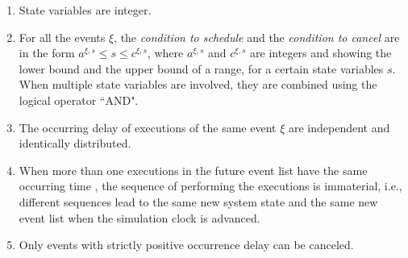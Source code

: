 \documentclass[]{interact}
\theoremstyle{plain}%
\theoremstyle{definition}
\theoremstyle{remark}
\begin{document}
\begin{enumerate}
	\item State variables are integer.
	\item For all the events $\xi$, the \textit{condition to schedule} and the \textit{condition to cancel} are in the form $a^{\xi,s}\le s \le c^{\xi,s}$, where $a^{\xi,s}$ and $c^{\xi,s}$ are integers and showing the lower bound and the upper bound of a range, for a certain state variables $s$. When multiple state variables are involved, they are combined using the logical operator ``AND".
	\item The occurring delay of executions of the same event $\xi$ are independent and identically distributed. %
	\item When more than one executions in the future event list have the same occurring time%
	, the sequence of performing the executions is immaterial, i.e., different sequences lead to the same new system state and the same new event list when the simulation clock is advanced.
	\item Only events with strictly positive occurrence delay can be canceled.
\end{enumerate}
\end{document}
